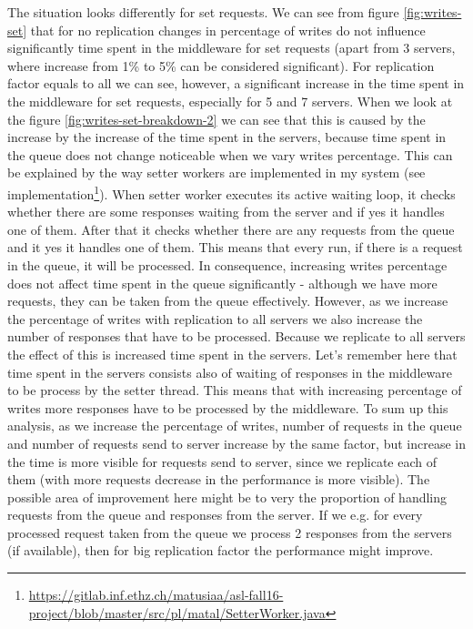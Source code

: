 \documentclass[11pt]{article}
\begin{document}
The situation looks differently for set requests. We can see from figure \ref{fig:writes-set} that for no replication changes in percentage of writes do not influence significantly time spent in the middleware for set requests (apart from 3 servers, where increase from 1\% to 5\% can be considered significant). For replication factor equals to all we can see, however, a significant increase in the time spent in the middleware for set requests, especially for 5 and 7 servers. When we look at the figure \ref{fig:writes-set-breakdown-2} we can see that this is caused by the increase by the increase of the time spent in the servers, because time spent in the queue does not change noticeable when we vary writes percentage. This can be explained by the way setter workers are implemented in my system (see implementation\footnote{\url{https://gitlab.inf.ethz.ch/matusiaa/asl-fall16-project/blob/master/src/pl/matal/SetterWorker.java}}). When setter worker executes its active waiting loop, it checks whether there are some responses waiting from the server and if yes it handles one of them. After that it checks whether there are any requests from the queue and it yes it handles one of them. This means that every run, if there is a request in the queue, it will be processed. In consequence, increasing writes percentage does not affect time spent in the queue significantly - although we have more requests, they can be taken from the queue effectively. However, as we increase the percentage of writes with replication to all servers we also increase the number of responses that have to be processed. Because we replicate to all servers the effect of this is increased time spent in the servers. Let's remember here that time spent in the servers consists also of waiting of responses in the middleware to be process by the setter thread. This means that with increasing percentage of writes more responses have to be processed by the middleware. To sum up this analysis, as we increase the percentage of writes, number of requests in the queue and number of requests send to server increase by the same factor, but increase in the time is more visible for requests send to server, since we replicate each of them (with more requests decrease in the performance is more visible). The possible area of improvement here might be to very the proportion of handling requests from the queue and responses from the server. If we e.g. for every processed request taken from the queue we process 2 responses from the servers (if available), then for big replication factor the performance might improve.
\end{document}
